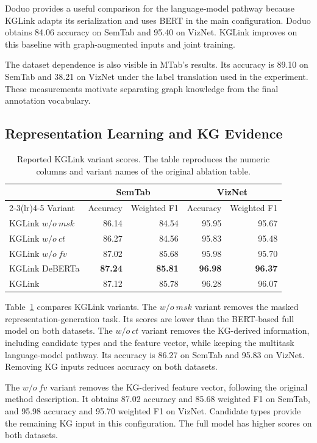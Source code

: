 Doduo provides a useful comparison for the language-model pathway because KGLink adapts its serialization and uses BERT in the main configuration. Doduo obtains 84.06 accuracy on SemTab and 95.40 on VizNet. KGLink improves on this baseline with graph-augmented inputs and joint training.

The dataset dependence is also visible in MTab's results. Its accuracy is 89.10 on SemTab and 38.21 on VizNet under the label translation used in the experiment. These measurements motivate separating graph knowledge from the final annotation vocabulary.

\subsection{Representation Learning and KG Evidence}
\label{sec:kglink:ablation}

\begin{table}[tbp]
\centering
\caption{Reported KGLink variant scores. The table reproduces the numeric columns and variant names of the original ablation table.}
\label{tab:kglink:ablation}
\begin{tabular}{lrrrr}
\toprule
&\multicolumn{2}{c}{SemTab}&\multicolumn{2}{c}{VizNet}\\
\cmidrule(lr){2-3}\cmidrule(lr){4-5}
Variant&Accuracy&Weighted F1&Accuracy&Weighted F1\\
\midrule
KGLink $w/o\ msk$&86.14&84.54&95.95&95.67\\
KGLink $w/o\ ct$&86.27&84.56&95.83&95.48\\
KGLink $w/o\ fv$&87.02&85.68&95.98&95.70\\
KGLink DeBERTa&\textbf{87.24}&\textbf{85.81}&\textbf{96.98}&\textbf{96.37}\\
KGLink&87.12&85.78&96.28&96.07\\
\bottomrule
\end{tabular}
\end{table}

Table~\ref{tab:kglink:ablation} compares KGLink variants. The $w/o\ msk$ variant removes the masked representation-generation task. Its scores are lower than the BERT-based full model on both datasets. The $w/o\ ct$ variant removes the KG-derived information, including candidate types and the feature vector, while keeping the multitask language-model pathway. Its accuracy is 86.27 on SemTab and 95.83 on VizNet. Removing KG inputs reduces accuracy on both datasets.

The $w/o\ fv$ variant removes the KG-derived feature vector, following the original method description. It obtains 87.02 accuracy and 85.68 weighted F1 on SemTab, and 95.98 accuracy and 95.70 weighted F1 on VizNet. Candidate types provide the remaining KG input in this configuration. The full model has higher scores on both datasets.

